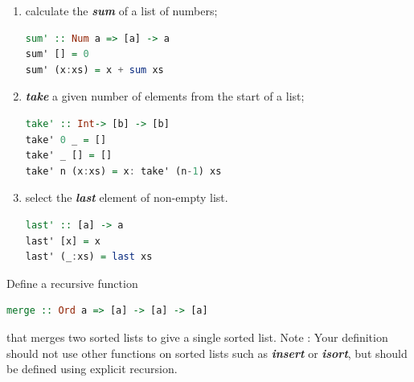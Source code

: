 \documentclass{article}
\begin{document}
\begin{solution}
\begin{enumerate}
	\item calculate the \textbf{\textit{sum}} of a list of numbers;
\begin{lstlisting}[language=Haskell]
sum' :: Num a => [a] -> a
sum' [] = 0
sum' (x:xs) = x + sum xs
\end{lstlisting}
	\item \textbf{\textit{take}} a given number of elements from the start of a list;
	\begin{lstlisting}[language=Haskell]
take' :: Int-> [b] -> [b]
take' 0 _ = []
take' _ [] = []
take' n (x:xs) = x: take' (n-1) xs
\end{lstlisting}
	\item select the \textbf{\textit{last}} element of non-empty list.
	\begin{lstlisting}[language=Haskell]
last' :: [a] -> a
last' [x] = x
last' (_:xs) = last xs
\end{lstlisting}
\end{enumerate}
\end{solution}


\pagebreak 
\begin{exercise}
Define a recursive function 
\begin{lstlisting}[language=Haskell]
  merge :: Ord a => [a] -> [a] -> [a]
\end{lstlisting}
that merges two sorted lists to give a single sorted list. 
Note : Your definition should not use other functions on sorted lists such as  \textbf{\textit{insert}} or  \textbf{\textit{isort}}, but should be defined using explicit recursion.
\end{exercise}
\end{document}
